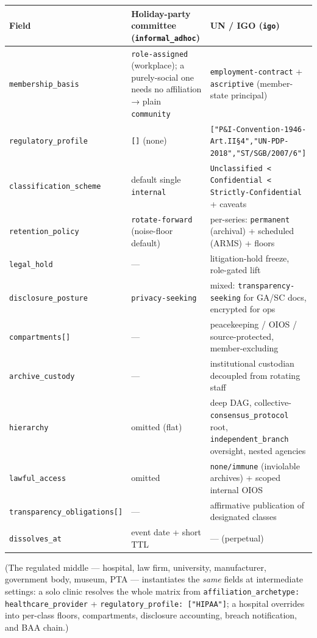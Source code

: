 \documentclass[11pt]{article}
\begin{document}
{\footnotesize
\begin{longtable}{|p{5.33cm}|p{5.33cm}|p{5.33cm}|}\hline
\textbf{Field} & \textbf{Holiday-party committee (\texttt{informal\_adhoc})} & \textbf{UN / IGO (\texttt{igo})} \\ \hline\endhead
\texttt{membership\_basis} & \texttt{role-assigned} (workplace); a purely-social one needs no affiliation → plain \texttt{community} & \texttt{employment-contract} + \texttt{ascriptive} (member-state principal) \\ \hline
\texttt{regulatory\_profile} & \texttt{[]} (none) & \texttt{["P\&I-Convention-1946-Art.II§4","UN-PDP-2018","ST/SGB/2007/6"]} \\ \hline
\texttt{classification\_scheme} & default single \texttt{internal} & \texttt{Unclassified < Confidential < Strictly-Confidential} + caveats \\ \hline
\texttt{retention\_policy} & \texttt{rotate-forward} (noise-floor default) & per-series: \texttt{permanent} (archival) + scheduled (ARMS) + floors \\ \hline
\texttt{legal\_hold} & — & litigation-hold freeze, role-gated lift \\ \hline
\texttt{disclosure\_posture} & \texttt{privacy-seeking} & mixed: \texttt{transparency-seeking} for GA/SC docs, encrypted for ops \\ \hline
\texttt{compartments[]} & — & peacekeeping / OIOS / source-protected, member-excluding \\ \hline
\texttt{archive\_custody} & — & institutional custodian decoupled from rotating staff \\ \hline
\texttt{hierarchy} & omitted (flat) & deep DAG, collective-\texttt{consensus\_protocol} root, \texttt{independent\_branch} oversight, nested agencies \\ \hline
\texttt{lawful\_access} & omitted & \texttt{none/immune} (inviolable archives) + scoped internal OIOS \\ \hline
\texttt{transparency\_obligations[]} & — & affirmative publication of designated classes \\ \hline
\texttt{dissolves\_at} & event date + short TTL & — (perpetual) \\ \hline
\end{longtable}}


(The regulated middle — hospital, law firm, university, manufacturer, government body, museum, PTA — instantiates the \textit{same} fields at intermediate settings: a solo clinic resolves the whole matrix from \texttt{affiliation\_archetype: healthcare\_provider} + \texttt{regulatory\_profile: ["HIPAA"]}; a hospital overrides into per-class floors, compartments, disclosure accounting, breach notification, and BAA chain.)
\end{document}
